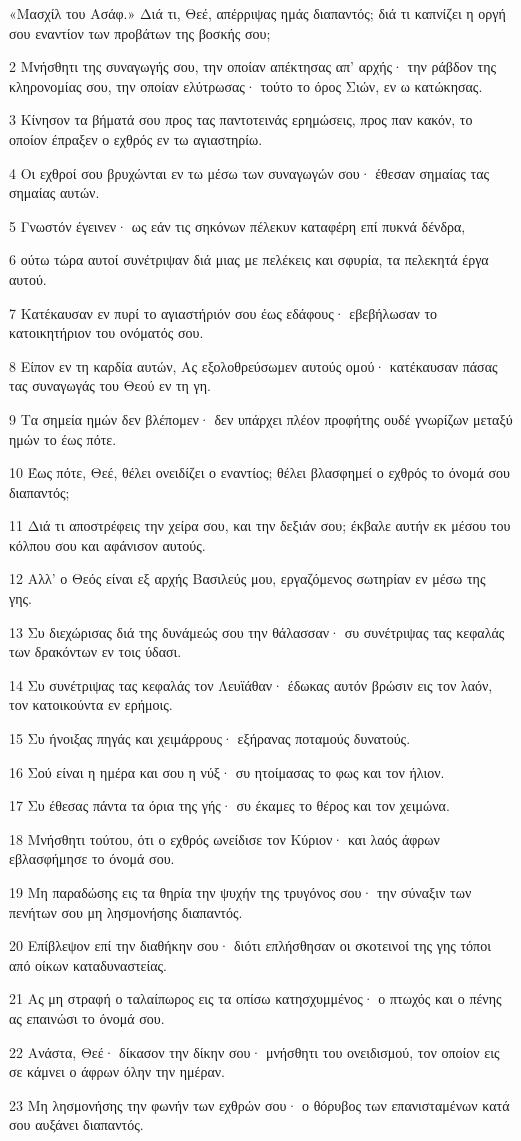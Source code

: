 \par «Μασχίλ του Ασάφ.» Διά τι, Θεέ, απέρριψας ημάς διαπαντός; διά τι καπνίζει η οργή σου εναντίον των προβάτων της βοσκής σου;
\par 2 Μνήσθητι της συναγωγής σου, την οποίαν απέκτησας απ' αρχής· την ράβδον της κληρονομίας σου, την οποίαν ελύτρωσας· τούτο το όρος Σιών, εν ω κατώκησας.
\par 3 Κίνησον τα βήματά σου προς τας παντοτεινάς ερημώσεις, προς παν κακόν, το οποίον έπραξεν ο εχθρός εν τω αγιαστηρίω.
\par 4 Οι εχθροί σου βρυχώνται εν τω μέσω των συναγωγών σου· έθεσαν σημαίας τας σημαίας αυτών.
\par 5 Γνωστόν έγεινεν· ως εάν τις σηκόνων πέλεκυν καταφέρη επί πυκνά δένδρα,
\par 6 ούτω τώρα αυτοί συνέτριψαν διά μιας με πελέκεις και σφυρία, τα πελεκητά έργα αυτού.
\par 7 Κατέκαυσαν εν πυρί το αγιαστήριόν σου έως εδάφους· εβεβήλωσαν το κατοικητήριον του ονόματός σου.
\par 8 Είπον εν τη καρδία αυτών, Ας εξολοθρεύσωμεν αυτούς ομού· κατέκαυσαν πάσας τας συναγωγάς του Θεού εν τη γη.
\par 9 Τα σημεία ημών δεν βλέπομεν· δεν υπάρχει πλέον προφήτης ουδέ γνωρίζων μεταξύ ημών το έως πότε.
\par 10 Έως πότε, Θεέ, θέλει ονειδίζει ο εναντίος; θέλει βλασφημεί ο εχθρός το όνομά σου διαπαντός;
\par 11 Διά τι αποστρέφεις την χείρα σου, και την δεξιάν σου; έκβαλε αυτήν εκ μέσου του κόλπου σου και αφάνισον αυτούς.
\par 12 Αλλ' ο Θεός είναι εξ αρχής Βασιλεύς μου, εργαζόμενος σωτηρίαν εν μέσω της γης.
\par 13 Συ διεχώρισας διά της δυνάμεώς σου την θάλασσαν· συ συνέτριψας τας κεφαλάς των δρακόντων εν τοις ύδασι.
\par 14 Συ συνέτριψας τας κεφαλάς τον Λευϊάθαν· έδωκας αυτόν βρώσιν εις τον λαόν, τον κατοικούντα εν ερήμοις.
\par 15 Συ ήνοιξας πηγάς και χειμάρρους· εξήρανας ποταμούς δυνατούς.
\par 16 Σού είναι η ημέρα και σου η νύξ· συ ητοίμασας το φως και τον ήλιον.
\par 17 Συ έθεσας πάντα τα όρια της γής· συ έκαμες το θέρος και τον χειμώνα.
\par 18 Μνήσθητι τούτου, ότι ο εχθρός ωνείδισε τον Κύριον· και λαός άφρων εβλασφήμησε το όνομά σου.
\par 19 Μη παραδώσης εις τα θηρία την ψυχήν της τρυγόνος σου· την σύναξιν των πενήτων σου μη λησμονήσης διαπαντός.
\par 20 Επίβλεψον επί την διαθήκην σου· διότι επλήσθησαν οι σκοτεινοί της γης τόποι από οίκων καταδυναστείας.
\par 21 Ας μη στραφή ο ταλαίπωρος εις τα οπίσω κατησχυμμένος· ο πτωχός και ο πένης ας επαινώσι το όνομά σου.
\par 22 Ανάστα, Θεέ· δίκασον την δίκην σου· μνήσθητι του ονειδισμού, τον οποίον εις σε κάμνει ο άφρων όλην την ημέραν.
\par 23 Μη λησμονήσης την φωνήν των εχθρών σου· ο θόρυβος των επανισταμένων κατά σου αυξάνει διαπαντός.

